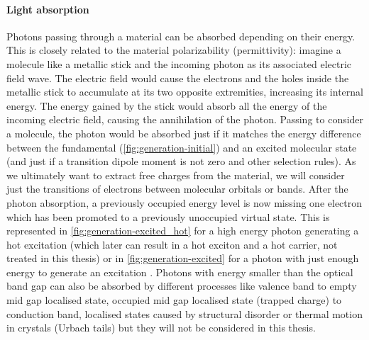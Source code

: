 		\paragraph{Light absorption}
		Photons passing through a material can be absorbed depending on their energy.
		This is closely related to the material polarizability (permittivity): imagine a molecule like a metallic stick and the incoming photon as its associated electric field wave.
		The electric field would cause the electrons and the holes inside the metallic stick to accumulate at its two opposite extremities, increasing its internal energy.
		The energy gained by the stick would absorb all the energy of the incoming electric field, causing the annihilation of the photon.
		Passing to consider a molecule, the photon would be absorbed just if it matches the energy difference between the fundamental (\cref{fig:generation-initial}) and an excited molecular state (and just if a transition dipole moment is not zero and other selection rules).
		As we ultimately want to extract free charges from the material, we will consider just the transitions of electrons between molecular orbitals or bands.
		After the photon absorption, a previously occupied energy level is now missing one electron which has been promoted to a previously unoccupied virtual state.
		This is represented in \cref{fig:generation-excited_hot} for a high energy photon generating a hot excitation  (which later can result in a hot exciton and a hot carrier, not treated in this thesis) or in \cref{fig:generation-excited} for a photon with just enough energy to generate an excitation .
		Photons with energy smaller than the optical band gap can also be absorbed by different processes like valence band to empty mid gap localised state, occupied mid gap localised state (trapped charge) to conduction band, localised states caused by structural disorder or thermal motion in crystals (Urbach tails) but they will not be considered in this thesis.

